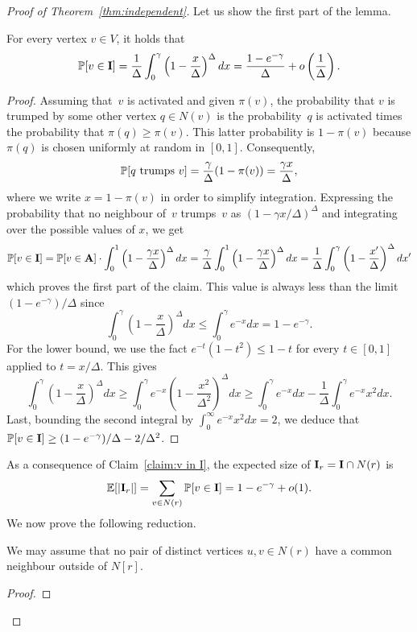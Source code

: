 \begin{proof}[Proof of Theorem~\ref{thm:independent}]
Let us show the first part of the lemma.
\begin{claim}\label{claim:v in I}
        For every vertex $v\in V$,
        it holds that 
\[
\mathbb{P}[v\in{\bf{I}}]=
        \frac{1}{\Delta}\int_0^\gamma\left(1 -\frac{x}{\Delta}\right)^{\Delta} dx=
\frac{1-e^{-\gamma}}{\Delta}+o\left(\frac{1}{\Delta}\right).
\]
\end{claim}
\begin{proof}
Assuming that~$v$ is activated
and given $\pi(v)$, the probability that $v$ is trumped by some
other vertex $q\in N(v)$ is the probability~$q$ is activated times the probability
that $\pi(q)\geq\pi(v)$.
This latter probability is $1-\pi(v)$ because $\pi(q)$ is chosen uniformly at random in $[0,1]$.
Consequently,
\[
        \mathbb{P}[q\text{ trumps }v]=\frac{\gamma}{\Delta}(1-\pi(v)) = \frac{\gamma x}{\Delta},
\]
where we write $x=1-\pi(v)$ in order to simplify integration.
Expressing the probability that no neighbour of~$v$ trumps~$v$ as
$\left(1- \gamma x/\Delta\right)^\Delta$ and integrating over the possible values of $x$,
we get
\[
        \mathbb{P}[v\in{\bf{I}}] =
        \mathbb{P}[v\in{\bf{A}}]\cdot\int_0^1\left(1 -\frac{\gamma x}{\Delta}\right)^{\Delta} dx
        = \frac{\gamma}{\Delta}\int_0^1\left(1 -\frac{\gamma x}{\Delta}\right)^{\Delta} dx
        = \frac{1}{\Delta}\int_0^\gamma\left(1 -\frac{x'}{\Delta}\right)^{\Delta} dx'
\]
which proves the first part of the claim.
This value is always less than the limit $(1-e^{-\gamma})/\Delta$
since
\[\int_0^\gamma\left(1-\frac{x}{\Delta}\right)^{\Delta}dx\leq\int_0^\gamma e^{-x}dx=1-e^{-\gamma}.
\]
For the lower bound, we use the fact $e^{-t}(1-t^2)\leq 1-t$ for every $t\in[0,1]$
applied to $t=x/\Delta$.
This gives
\[\int_0^\gamma\left(1-\frac{x}{\Delta}\right)^{\Delta}dx\geq \int_0^\gamma e^{-x}\left(1-\frac{x^2}{\Delta^2}\right)^{\Delta}dx
\geq \int_0^\gamma e^{-x}dx -\frac{1}{\Delta}\int_0^\gamma e^{-x}x^2 dx.
\]
Last, bounding the second integral by $\int_0^\infty e^{-x}x^2dx=2$,
we deduce that $\mathbb{P}[v\in{\bf{I}}]\geq (1-e^{-\gamma})/\Delta-2/\Delta^2$. 
\end{proof}
As a consequence of Claim~\ref{claim:v in I},
the expected size of ${\bf{I}}_r={\bf{I}}\cap N(r)$ is
\[
\mathbb{E}[|{\bf{I}}_r|]=\sum_{v\in N(r)}\mathbb{P}[v\in {\bf{I}}]= 1 - e^{-\gamma} + o(1).
\]
We now prove the following reduction.
\begin{claim}\label{claim:no outside p3}
We may assume that no pair of distinct vertices $u,v\in N(r)$ have a common neighbour outside of
$N[r]$.
\end{claim}
\begin{proof}

\end{proof}
\end{proof}

